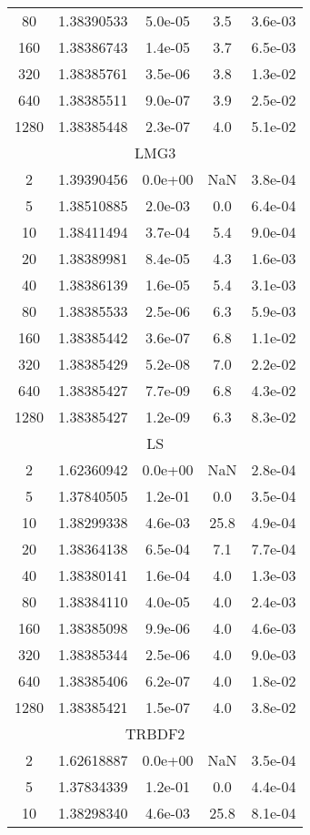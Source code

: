\documentclass[]{rAMF2e}
\begin{document}
{\begin{table}[htp]
\begin{tabular}{|c|c|c|c|c|}
 80 & 1.38390533 & 5.0e-05 & 3.5 & 3.6e-03\\
 160 & 1.38386743 & 1.4e-05 & 3.7 & 6.5e-03\\
 320 & 1.38385761 & 3.5e-06 & 3.8 & 1.3e-02\\
 640 & 1.38385511 & 9.0e-07 & 3.9 & 2.5e-02\\
 1280 & 1.38385448 & 2.3e-07 & 4.0 & 5.1e-02\\
\hline \multicolumn{5}{|c|}{LMG3} \\ \hline
 2 & 1.39390456 & 0.0e+00 & NaN & 3.8e-04\\
 5 & 1.38510885 & 2.0e-03 & 0.0 & 6.4e-04\\
 10 & 1.38411494 & 3.7e-04 & 5.4 & 9.0e-04\\
 20 & 1.38389981 & 8.4e-05 & 4.3 & 1.6e-03\\
 40 & 1.38386139 & 1.6e-05 & 5.4 & 3.1e-03\\
 80 & 1.38385533 & 2.5e-06 & 6.3 & 5.9e-03\\
 160 & 1.38385442 & 3.6e-07 & 6.8 & 1.1e-02\\
 320 & 1.38385429 & 5.2e-08 & 7.0 & 2.2e-02\\
 640 & 1.38385427 & 7.7e-09 & 6.8 & 4.3e-02\\
 1280 & 1.38385427 & 1.2e-09 & 6.3 & 8.3e-02\\
\hline \multicolumn{5}{|c|}{LS} \\ \hline
 2 & 1.62360942 & 0.0e+00 & NaN & 2.8e-04\\
 5 & 1.37840505 & 1.2e-01 & 0.0 & 3.5e-04\\
 10 & 1.38299338 & 4.6e-03 & 25.8 & 4.9e-04\\
 20 & 1.38364138 & 6.5e-04 & 7.1 & 7.7e-04\\
 40 & 1.38380141 & 1.6e-04 & 4.0 & 1.3e-03\\
 80 & 1.38384110 & 4.0e-05 & 4.0 & 2.4e-03\\
 160 & 1.38385098 & 9.9e-06 & 4.0 & 4.6e-03\\
 320 & 1.38385344 & 2.5e-06 & 4.0 & 9.0e-03\\
 640 & 1.38385406 & 6.2e-07 & 4.0 & 1.8e-02\\
 1280 & 1.38385421 & 1.5e-07 & 4.0 & 3.8e-02\\
\hline \multicolumn{5}{|c|}{TRBDF2} \\ \hline
 2 & 1.62618887 & 0.0e+00 & NaN & 3.5e-04\\
 5 & 1.37834339 & 1.2e-01 & 0.0 & 4.4e-04\\
 10 & 1.38298340 & 4.6e-03 & 25.8 & 8.1e-04\\

\end{tabular}
\end{table}}
\end{document}
